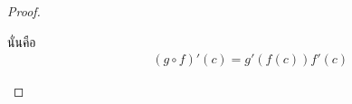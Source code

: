\documentclass[12pt, a4paper]{article}
\begin{document}
\begin{enumerate}
\begin{proof}
\begin{enumerate}
        นั่นคือ \begin{eqnarray*}
        \hspace{1cm} {\left ( g\circ f \right )}' \left ( c \right )={g}'\left ( f\left ( c \right ) \right ){f}'\left ( c \right )
        \end{eqnarray*}
         
         
         
        \end{enumerate}
    \end{proof}

\end{enumerate}
\end{document}
